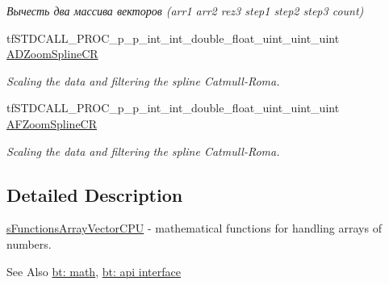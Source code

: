 \begin{DoxyCompactItemize}
\begin{DoxyCompactList}\small\item\em Вычесть два массива векторов (arr1 arr2 rez3 step1 step2 step3 count) \end{DoxyCompactList}\item 
\hypertarget{structs_functions_array_vector_c_p_u_a970fdb2b2a4dc53a5a279ded94b432ba}{tf\-S\-T\-D\-C\-A\-L\-L\-\_\-\-P\-R\-O\-C\-\_\-p\-\_\-p\-\_\-int\-\_\-int\-\_\-double\-\_\-float\-\_\-uint\-\_\-uint\-\_\-uint \hyperlink{structs_functions_array_vector_c_p_u_a970fdb2b2a4dc53a5a279ded94b432ba}{A\-D\-Zoom\-Spline\-C\-R}}\label{structs_functions_array_vector_c_p_u_a970fdb2b2a4dc53a5a279ded94b432ba}

\begin{DoxyCompactList}\small\item\em Scaling the data and filtering the spline Catmull-\/\-Roma. \end{DoxyCompactList}\item 
\hypertarget{structs_functions_array_vector_c_p_u_aa034ed7c89e3b24fbe0ec7841bed41b7}{tf\-S\-T\-D\-C\-A\-L\-L\-\_\-\-P\-R\-O\-C\-\_\-p\-\_\-p\-\_\-int\-\_\-int\-\_\-double\-\_\-float\-\_\-uint\-\_\-uint\-\_\-uint \hyperlink{structs_functions_array_vector_c_p_u_aa034ed7c89e3b24fbe0ec7841bed41b7}{A\-F\-Zoom\-Spline\-C\-R}}\label{structs_functions_array_vector_c_p_u_aa034ed7c89e3b24fbe0ec7841bed41b7}

\begin{DoxyCompactList}\small\item\em Scaling the data and filtering the spline Catmull-\/\-Roma. \end{DoxyCompactList}\end{DoxyCompactItemize}


\subsection{Detailed Description}
\hyperlink{structs_functions_array_vector_c_p_u}{s\-Functions\-Array\-Vector\-C\-P\-U} -\/ mathematical functions for handling arrays of numbers. 

\begin{DoxySeeAlso}{See Also}
\hyperlink{group__math}{bt\-: math}, \hyperlink{group__apiinterface}{bt\-: api interface} 
\end{DoxySeeAlso}


